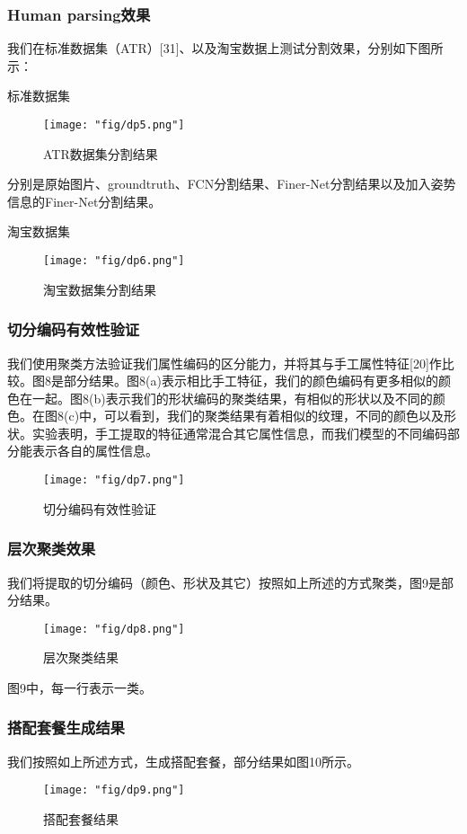 \subsubsection{Human parsing效果}
我们在标准数据集（ATR）[31]、以及淘宝数据上测试分割效果，分别如下图所示：

标准数据集
\begin{figure}[!h]
	\centering
	\texttt{[image: "fig/dp5.png"]}
	\caption{ATR数据集分割结果}
	\label{fig:dp5}
\end{figure}
分别是原始图片、groundtruth、FCN分割结果、Finer-Net分割结果以及加入姿势信息的Finer-Net分割结果。

淘宝数据集
\begin{figure}[!h]
	\centering
	\texttt{[image: "fig/dp6.png"]}
	\caption{淘宝数据集分割结果}
	\label{fig:dp6}
\end{figure}


\subsubsection{切分编码有效性验证}
我们使用聚类方法验证我们属性编码的区分能力，并将其与手工属性特征[20]作比较。图8是部分结果。图8(a)表示相比手工特征，我们的颜色编码有更多相似的颜色在一起。图8(b)表示我们的形状编码的聚类结果，有相似的形状以及不同的颜色。在图8(c)中，可以看到，我们的聚类结果有着相似的纹理，不同的颜色以及形状。实验表明，手工提取的特征通常混合其它属性信息，而我们模型的不同编码部分能表示各自的属性信息。
\begin{figure}[!h]
	\centering
	\texttt{[image: "fig/dp7.png"]}
	\caption{切分编码有效性验证}
	\label{fig:dp7}
\end{figure}

\subsubsection{层次聚类效果}
我们将提取的切分编码（颜色、形状及其它）按照如上所述的方式聚类，图9是部分结果。
\begin{figure}[!h]
	\centering
	\texttt{[image: "fig/dp8.png"]}
	\caption{层次聚类结果}
	\label{fig:dp8}
\end{figure}

图9中，每一行表示一类。

\subsubsection{搭配套餐生成结果}
我们按照如上所述方式，生成搭配套餐，部分结果如图10所示。
\begin{figure}[!h]
	\centering
	\texttt{[image: "fig/dp9.png"]}
	\caption{搭配套餐结果}
	\label{fig:dp9}
\end{figure}


